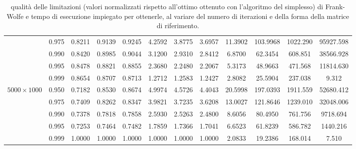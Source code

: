 \begin{landscape}
\begin{table}[!h]
\begin{tabularx}{677.40169pt}{cccccccccccc}
        & 0.975 & 0.8211 & 0.9139 & 0.9245 & 4.2592 & 3.8775 & 3.6957 & 11.3902 & 103.9968 & 1022.290 & 95927.598 \\
        & 0.990 & 0.8420 & 0.8985 & 0.9044 & 3.1200 & 2.9310 & 2.8412 & 6.8700 & 62.3454 & 608.851 & 38566.928 \\
        & 0.995 & 0.8478 & 0.8821 & 0.8855 & 2.3680 & 2.2480 & 2.2067 & 5.3173 & 48.9663 & 471.568 & 11814.630 \\
        & 0.999 & 0.8654 & 0.8707 & 0.8713 & 1.2712 & 1.2583 & 1.2427 & 2.8082 & 25.5904 & 237.038 & 9.312 \\
        \midrule
        \( 5000\times 1000 \)
        & 0.950 & 0.7182 & 0.8530 & 0.8674 & 4.9974 & 4.5726 & 4.4043 & 20.5998 & 197.0393 & 1911.559 & 52680.412 \\
        & 0.975 & 0.7409 & 0.8262 & 0.8347 & 3.9821 & 3.7235 & 3.6208 & 13.0027 & 121.8646 & 1239.010 & 32048.006 \\
        & 0.990 & 0.7378 & 0.7818 & 0.7858 & 2.5930 & 2.5263 & 2.4800 & 8.6056 & 80.4950 & 761.756 & 9718.694 \\
        & 0.995 & 0.7253 & 0.7464 & 0.7482 & 1.7859 & 1.7366 & 1.7041 & 6.6523 & 61.8239 & 586.782 & 1440.216 \\
        & 0.999 & 1.0000 & 1.0000 & 1.0000 & 1.0000 & 1.0000 & 1.0000 & 2.0833 & 19.2386 & 168.014 & 7.510 \\
        \bottomrule
    \end{tabularx}
    \caption{qualità delle limitazioni (valori normalizzati rispetto all'ottimo ottenuto con l'algoritmo del simplesso)
    di Frank-Wolfe e tempo di esecuzione impiegato per ottenerle, al variare del numero di iterazioni e della forma
    della matrice di riferimento.}
    \label{table:hugetable3}
\end{table}
\end{landscape}

